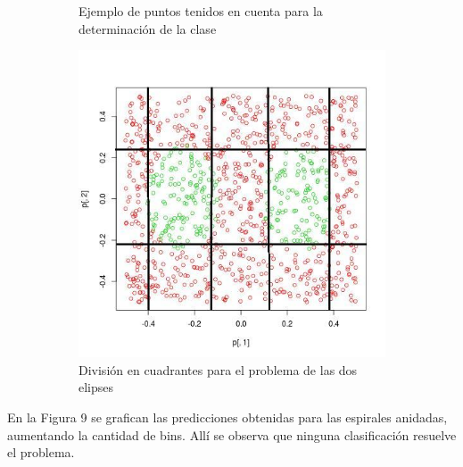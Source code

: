 \documentclass[12pt, a4paper]{article}
\begin{document}
\begin{figure}
\begin{subfigure}[b]{0.35\textwidth}
        \caption{Ejemplo de puntos tenidos en cuenta para la determinación de la clase}
    \end{subfigure}  
    \begin{subfigure}[b]{0.35\textwidth}
        \includegraphics[width=\textwidth]{dos_elipses_cuadrantes}
        \caption{División en cuadrantes para el problema de las dos elipses}
    \end{subfigure}      
    \caption{}
\end{figure}

\bigskip

En la Figura 9 se grafican las predicciones obtenidas para las espirales anidadas, aumentando la cantidad de bins. Allí se observa que ninguna clasificación resuelve el problema.
\end{document}
